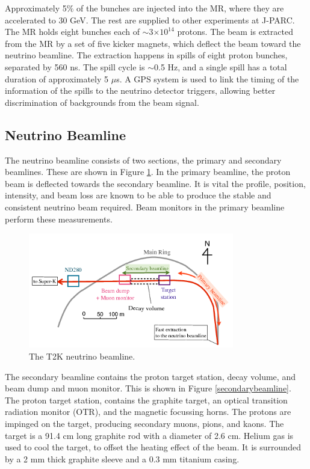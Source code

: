 Approximately 5$\%$ of the bunches are injected into the MR, where they are accelerated to 30 GeV. The rest are supplied to other experiments at J-PARC. The MR holds eight bunches each of $\sim$3$\times10^{14}$ protons. The beam is extracted from the MR by a set of five kicker magnets, which deflect the beam toward the neutrino beamline. The extraction happens in spills of eight proton bunches, separated by 560 ns. The spill cycle is $\sim$0.5 Hz, and a single spill has a total duration of approximately 5 $\mu$s. A GPS system is used to link the timing of the information of the spills to the neutrino detector triggers, allowing better discrimination of backgrounds from the beam signal.

\subsection{Neutrino Beamline}

The neutrino beamline consists of two sections, the primary and secondary beamlines. These are shown in Figure \ref{beamline}. In the primary beamline, the proton beam is deflected towards the secondary beamline. It is vital the profile, position, intensity, and beam loss are known to be able to produce the stable and consistent neutrino beam required. Beam monitors in the primary beamline perform these measurements. 

\begin{figure}[!htbp]
\centering
\includegraphics*[width=0.8\textwidth,clip]{figs/beamline}
\caption{The T2K neutrino beamline.} \label{beamline}
\end{figure}

The secondary beamline contains the proton target station, decay volume, and beam dump and muon monitor. This is shown in Figure \ref{secondarybeamline}. The proton target station, contains the graphite target, an optical transition radiation monitor (OTR), and the magnetic focussing horns. The protons are impinged on the target, producing secondary muons, pions, and kaons. The target is a 91.4 cm long graphite rod with a diameter of 2.6 cm. Helium gas is used to cool the target, to offset the heating effect of the beam. It is surrounded by a 2 mm thick graphite sleeve and a 0.3 mm titanium casing. 

